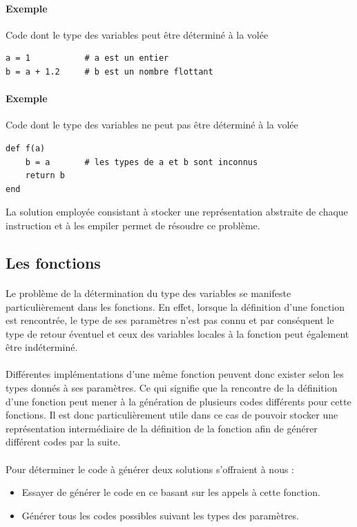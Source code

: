\documentclass[12pt]{article}
\begin{document}
\paragraph{Exemple} Code dont le type des variables peut être déterminé à la volée
\begin{verbatim}
a = 1           # a est un entier
b = a + 1.2     # b est un nombre flottant
\end{verbatim}

\paragraph{Exemple} Code dont le type des variables ne peut pas être déterminé à la volée
\begin{verbatim}
def f(a)
    b = a       # les types de a et b sont inconnus
    return b
end 
\end{verbatim}

La solution employée consistant à stocker une représentation abstraite de chaque instruction et à les empiler permet de résoudre ce problème.

\subsection{Les fonctions}

\paragraph{}Le problème de la détermination du type des variables se manifeste particulièrement dans les fonctions. En effet, lorsque la définition d'une fonction est rencontrée, le type de ses paramètres n'est pas connu et par conséquent le type de retour éventuel et ceux des variables locales à la fonction peut également être indéterminé.

\paragraph{}Différentes implémentations d'une même fonction peuvent donc exister selon les types donnés à ses paramètres. Ce qui signifie que la rencontre de la définition d'une fonction peut mener à la génération de plusieurs codes différents pour cette fonctions. Il est donc particulièrement utile dans ce cas de pouvoir stocker une représentation intermédiaire de la définition de la fonction afin de générer différent codes par la suite.

\paragraph{}Pour déterminer le code à générer deux solutions s'offraient à nous :
\begin{itemize}
	\item Essayer de générer le code en ce basant sur les appels à cette fonction. 
	\item Générer tous les codes possibles suivant les types des paramètres.
\end{itemize}
\end{document}
